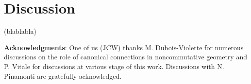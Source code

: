 \documentclass[a4paper,11pt,twoside]{article}
\numberwithin{equation}{section}
\theoremstyle{nonumberplain}
\newcounter{and}
\begin{document}

\section{Discussion}

%
%

(blablabla)


\vspace*{40pt}\noindent\textbf{Acknowledgments}: One of us (JCW) thanks M. Dubois-Violette for numerous discussions on the role of canonical connections in noncommutative geometry and P. Vitale for discussions at various stage of this work. Discussions with N. Pinamonti are gratefully acknowledged. 




\small
\end{document}
